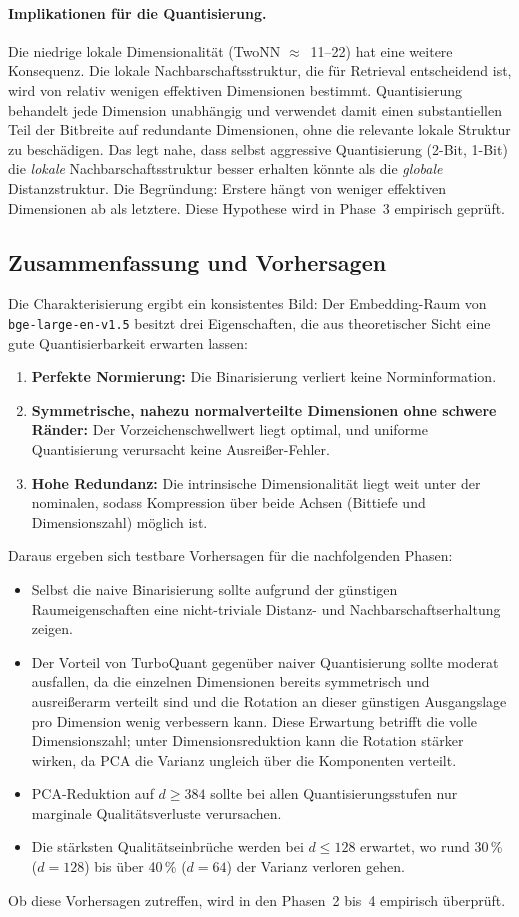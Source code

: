 \paragraph{Implikationen für die Quantisierung.}
Die niedrige lokale Dimensionalität (TwoNN $\approx$~11--22) hat eine weitere Konsequenz.
Die lokale Nachbarschaftsstruktur, die für Retrieval entscheidend ist, wird von relativ wenigen effektiven Dimensionen bestimmt.
Quantisierung behandelt jede Dimension unabhängig und verwendet damit einen substantiellen Teil der Bitbreite auf redundante Dimensionen, ohne die relevante lokale Struktur zu beschädigen.
%
Das legt nahe, dass selbst aggressive Quantisierung (2-Bit, 1-Bit) die \emph{lokale} Nachbarschaftsstruktur besser erhalten könnte als die \emph{globale} Distanzstruktur.
Die Begründung: Erstere hängt von weniger effektiven Dimensionen ab als letztere.
Diese Hypothese wird in Phase~3 empirisch geprüft.
%
\subsection{Zusammenfassung und Vorhersagen}
\label{sec:ergebnisse_phase1_vorhersagen}
%
Die Charakterisierung ergibt ein konsistentes Bild: Der Embedding-Raum von \texttt{bge-\allowbreak large-\allowbreak en-\allowbreak v1.5} besitzt drei Eigenschaften, die aus theoretischer Sicht eine gute Quantisierbarkeit erwarten lassen:
\begin{enumerate}
  \item \textbf{Perfekte Normierung:} Die Binarisierung verliert keine Norminformation.
  \item \textbf{Symmetrische, nahezu normalverteilte Dimensionen ohne schwere Ränder:} Der Vorzeichenschwellwert liegt optimal, und uniforme Quantisierung verursacht keine Ausreißer-Fehler.
  \item \textbf{Hohe Redundanz:} Die intrinsische Dimensionalität liegt weit unter der nominalen, sodass Kompression über beide Achsen (Bittiefe und Dimensionszahl) möglich ist.
\end{enumerate}
%
Daraus ergeben sich testbare Vorhersagen für die nachfolgenden Phasen:
\begin{itemize}
  \item Selbst die naive Binarisierung sollte aufgrund der günstigen Raumeigenschaften eine nicht-triviale Distanz- und Nachbarschaftserhaltung zeigen.
  \item Der Vorteil von TurboQuant gegenüber naiver Quantisierung sollte moderat ausfallen, da die einzelnen Dimensionen bereits symmetrisch und ausreißerarm verteilt sind und die Rotation an dieser günstigen Ausgangslage pro Dimension wenig verbessern kann. Diese Erwartung betrifft die volle Dimensionszahl; unter Dimensionsreduktion kann die Rotation stärker wirken, da PCA die Varianz ungleich über die Komponenten verteilt.
  \item PCA-Reduktion auf $d \geq 384$ sollte bei allen Quantisierungsstufen nur marginale Qualitätsverluste verursachen.
  \item Die stärksten Qualitätseinbrüche werden bei $d \leq 128$ erwartet, wo rund 30\,\% ($d = 128$) bis über 40\,\% ($d = 64$) der Varianz verloren gehen.
\end{itemize}
%
Ob diese Vorhersagen zutreffen, wird in den Phasen~2 bis~4 empirisch überprüft.
%
